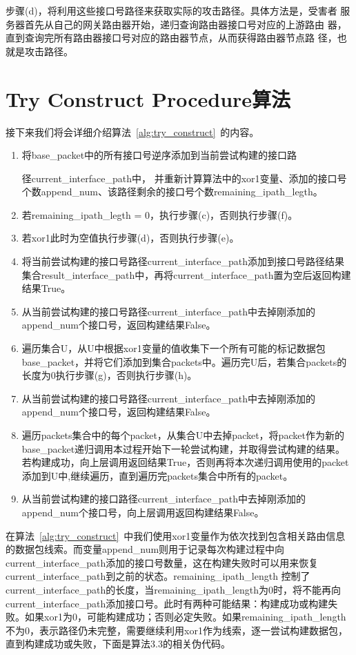 步骤(d)，将利用这些接口号路径来获取实际的攻击路径。具体方法是，受害者
服务器首先从自己的网关路由器开始，递归查询路由器接口号对应的上游路由
器，直到查询完所有路由器接口号对应的路由器节点，从而获得路由器节点路
径，也就是攻击路径。

\section{Try Construct Procedure算法}

接下来我们将会详细介绍算法~\ref*{alg:try_construct}~的内容。



\begin{enumerate}[label=(\alph*).]
  \item 将base\_packet中的所有接口号逆序添加到当前尝试构建的接口路
  
  径current\_interface\_path中，
        并重新计算算法中的xor1变量、添加的接口号个数append\_num、该路径剩余的接口号个数remaining\_ipath\_legth。
  \item 若remaining\_ipath\_legth = 0，执行步骤(c)，否则执行步骤(f)。
  \item 若xor1此时为空值执行步骤(d)，否则执行步骤(e)。
  \item 将当前尝试构建的接口号路径current\_interface\_path添加到接口号路径结果集合result\_interface\_path中，再将current\_interface\_path置为空后返回构建结果True。
  \item 从当前尝试构建的接口号路径current\_interface\_path中去掉刚添加的append\_num个接口号，返回构建结果False。
  \item 遍历集合U，从U中根据xor1变量的值收集下一个所有可能的标记数据包base\_packet，并将它们添加到集合packets中。遍历完U后，若集合packets的长度为0执行步骤(g)，否则执行步骤(h)。
  \item 从当前尝试构建的接口号路径current\_interface\_path中去掉刚添加的append\_num个接口号，返回构建结果False。
  \item 遍历packets集合中的每个packet，从集合U中去掉packet，将packet作为新的base\_packet递归调用本过程开始下一轮尝试构建，并取得尝试构建的结果。若构建成功，向上层调用返回结果True，否则再将本次递归调用使用的packet添加到U中,继续遍历，直到遍历完packets集合中所有的packet。
  \item 从当前尝试构建的接口路径current\_interface\_path中去掉刚添加的append\_num个接口号，向上层调用返回构建结果False。
\end{enumerate}


在算法~\ref*{alg:try_construct}~中我们使用xor1变量作为依次找到包含相关路由信息的数据包线索。而变量append\_num则用于记录每次构建过程中向current\_interface\_path添加的接口号数量，这在构建失败时可以用来恢复current\_interface\_path到之前的状态。remaining\_ipath\_length 控制了current\_interface\_path的长度，当remaining\_ipath\_length为0时，将不能再向current\_interface\_path添加接口号。此时有两种可能结果：构建成功或构建失败。如果xor1为0，可能构建成功；否则必定失败。如果remaining\_ipath\_length不为0，表示路径仍未完整，需要继续利用xor1作为线索，逐一尝试构建数据包，直到构建成功或失败，下面是算法3.3的相关伪代码。


